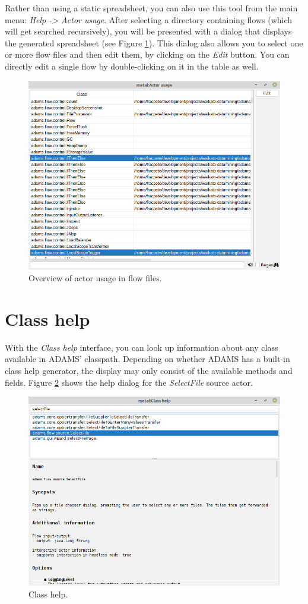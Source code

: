 Rather than using a static spreadsheet, you can also use this tool from the
main menu: \textit{Help -> Actor usage}. After selecting a directory containing
flows (which will get searched recursively), you will be presented with a dialog
that displays the generated spreadsheet (see Figure \ref{actor_usage}). This
dialog also allows you to select one or more flow files and then edit them,
by clicking on the \textit{Edit} button. You can directly edit a single flow
by double-clicking on it in the table as well.

\begin{figure}[htb]
  \centering
  \includegraphics[width=12.0cm]{images/actor_usage.png}
  \caption{Overview of actor usage in flow files.}
  \label{actor_usage}
\end{figure}

\newpage
\section{Class help}
With the \textit{Class help} interface, you can look up information about
any class available in ADAMS' classpath. Depending on whether ADAMS has a
built-in class help generator, the display may only consist of the available
methods and fields. Figure \ref{classhelp} shows the help dialog for the
\textit{SelectFile} source actor.

\begin{figure}[htb]
  \centering
  \includegraphics[width=12.0cm]{images/classhelp.png}
  \caption{Class help.}
  \label{classhelp}
\end{figure}

